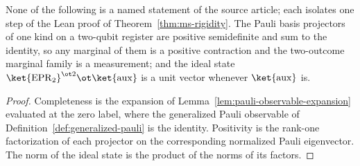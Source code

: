 \begin{lemma}\label{lem:ms-rigidity-support-ideal-target}
	\leanok
	None of the following is a named statement of the source article; each isolates one step of the Lean proof of Theorem~\ref{thm:ms-rigidity}. The Pauli basis projectors of one kind on a two-qubit register are positive semidefinite and sum to the identity, so any marginal of them is a positive contraction and the two-outcome marginal family is a measurement; and the ideal state $\ket{\mathrm{EPR}_2}^{\ot 2} \ot \ket{\mathrm{aux}}$ is a unit vector whenever $\ket{\mathrm{aux}}$ is.
\end{lemma}
\begin{proof}
	\leanok
	Completeness is the expansion of Lemma~\ref{lem:pauli-observable-expansion} evaluated at the zero label, where the generalized Pauli observable of Definition~\ref{def:generalized-pauli} is the identity. Positivity is the rank-one factorization of each projector on the corresponding normalized Pauli eigenvector. The norm of the ideal state is the product of the norms of its factors.
\end{proof}

